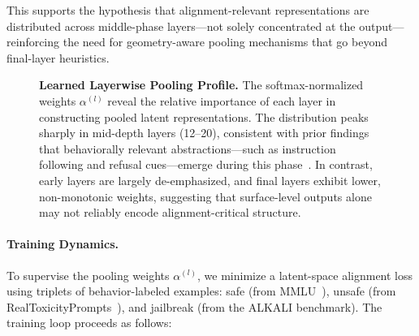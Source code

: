 This supports the hypothesis that alignment-relevant representations are distributed across middle-phase layers—not solely concentrated at the output—reinforcing the need for geometry-aware pooling mechanisms that go beyond final-layer heuristics.

\begin{figure}[ht]
\centering
{}
\caption{
\textbf{Learned Layerwise Pooling Profile.}
The softmax-normalized weights \(\alpha^{(l)}\) reveal the relative importance of each layer in constructing pooled latent representations. The distribution peaks sharply in mid-depth layers (12–20), consistent with prior findings that behaviorally relevant abstractions—such as instruction following and refusal cues—emerge during this phase~\cite{belrose2023language, liu2023lost}. In contrast, early layers are largely de-emphasized, and final layers exhibit lower, non-monotonic weights, suggesting that surface-level outputs alone may not reliably encode alignment-critical structure.
}
\label{fig:layer_attention_varied_random2}
\end{figure}

\vspace{1mm}
\paragraph{Training Dynamics.}  
To supervise the pooling weights \(\alpha^{(l)}\), we minimize a latent-space alignment loss using triplets of behavior-labeled examples: safe (from MMLU~\cite{hendrycks2021measuring}), unsafe (from RealToxicityPrompts~\cite{gehman2020realtoxicityprompts}), and jailbreak (from the ALKALI benchmark). The training loop proceeds as follows:

